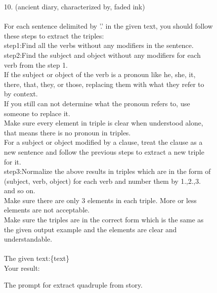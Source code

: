 \begin{figure}[htbp]
\begin{tcolorbox}
    10. (ancient diary, characterized by, faded ink)\\
\\
    For each sentence delimited by '.' in the given text, you should follow these steps to extract the triples:\\
    step1:Find all the verbs without any modifiers in the sentence.\\
    step2:Find the subject and object without any modifiers for each verb from the step 1.\\
    If the subject or object of the verb is a pronoun like he, she, it, there, that, they, or those, replacing them with what they refer to by context. \\
    If you still can not determine what the pronoun refers to, use someone to replace it.\\
    Make sure every element in triple is clear when understood alone, that means there is no pronoun in triples.\\
    For a subject or object modified by a clause, treat the clause as a new sentence and follow the previous steps to extract a new triple for it.\\
    step3:Normalize the above results in triples which are in the form of (subject, verb, object) for each verb and number them by 1.,2.,3. and so on.\\
    Make sure there are only 3 elements in each triple. More or less elements are not acceptable.\\
    Make sure the triples are in the correct form which is the same as the given output example and the elements are clear and understandable.\\
\\
    The given text:\{text\}\\
    Your result:\\
\end{tcolorbox}
\caption{The prompt for extract quadruple from story.}
\label{tab:extract quadruple}
\end{figure}


